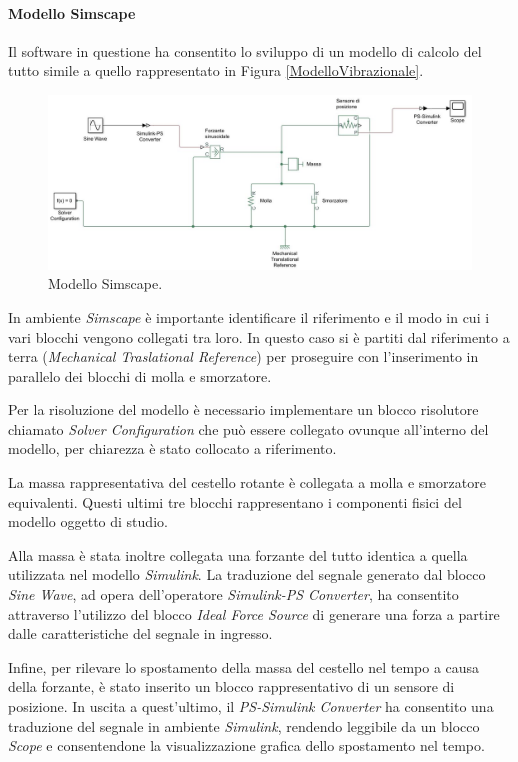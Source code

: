 \paragraph{Modello Simscape} Il software in questione ha consentito lo sviluppo di un modello di calcolo del tutto simile a quello rappresentato in Figura \ref{ModelloVibrazionale}. 
\begin{figure}[ht]
    \centering
    \includegraphics[width=\textwidth]{ModelloSimscape.JPG}
    \caption{Modello Simscape.}
    \label{ModelloSimscape}
\end{figure}

In ambiente \textit{Simscape} è importante identificare il riferimento e il modo in cui i vari blocchi vengono collegati tra loro. In questo caso si è partiti dal riferimento a terra (\textit{Mechanical Traslational Reference}) per proseguire con l'inserimento in parallelo dei blocchi di molla e smorzatore. 

Per la risoluzione del modello è necessario implementare un blocco risolutore chiamato \textit{Solver Configuration} che può essere collegato ovunque all'interno del modello, per chiarezza è stato collocato a riferimento. 

La massa rappresentativa del cestello rotante è collegata a molla e smorzatore equivalenti. Questi ultimi tre blocchi rappresentano i componenti fisici del modello oggetto di studio. 

Alla massa è stata inoltre collegata una forzante del tutto identica a quella utilizzata nel modello \textit{Simulink}. La traduzione del segnale generato dal blocco \textit{Sine Wave}, ad opera dell'operatore \textit{Simulink-PS Converter}, ha consentito attraverso l'utilizzo del blocco \textit{Ideal Force Source} di generare una forza a partire dalle caratteristiche del segnale in ingresso. 

Infine, per rilevare lo spostamento della massa del cestello nel tempo a causa della forzante, è stato inserito un blocco rappresentativo di un sensore di posizione. In uscita a quest'ultimo, il \textit{PS-Simulink Converter} ha consentito una traduzione del segnale in ambiente \textit{Simulink}, rendendo leggibile da un blocco \textit{Scope} e consentendone la visualizzazione grafica dello spostamento nel tempo. 


